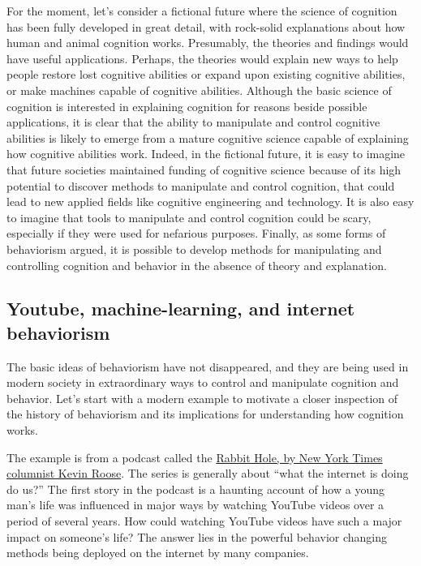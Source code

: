 \documentclass[
  oneside,
  12pt]{crumpbook}
\begin{document}
For the moment, let's consider a fictional future where the science of cognition has been fully developed in great detail, with rock-solid explanations about how human and animal cognition works. Presumably, the theories and findings would have useful applications. Perhaps, the theories would explain new ways to help people restore lost cognitive abilities or expand upon existing cognitive abilities, or make machines capable of cognitive abilities. Although the basic science of cognition is interested in explaining cognition for reasons beside possible applications, it is clear that the ability to manipulate and control cognitive abilities is likely to emerge from a mature cognitive science capable of explaining how cognitive abilities work. Indeed, in the fictional future, it is easy to imagine that future societies maintained funding of cognitive science because of its high potential to discover methods to manipulate and control cognition, that could lead to new applied fields like cognitive engineering and technology. It is also easy to imagine that tools to manipulate and control cognition could be scary, especially if they were used for nefarious purposes. Finally, as some forms of behaviorism argued, it is possible to develop methods for manipulating and controlling cognition and behavior in the absence of theory and explanation.

\hypertarget{youtube-machine-learning-and-internet-behaviorism}{%
\subsection{Youtube, machine-learning, and internet behaviorism}\label{youtube-machine-learning-and-internet-behaviorism}}

The basic ideas of behaviorism have not disappeared, and they are being used in modern society in extraordinary ways to control and manipulate cognition and behavior. Let's start with a modern example to motivate a closer inspection of the history of behaviorism and its implications for understanding how cognition works.

The example is from a podcast called the \href{https://www.nytimes.com/column/rabbit-hole}{Rabbit Hole, by New York Times columnist Kevin Roose}. The series is generally about ``what the internet is doing do us?'' The first story in the podcast is a haunting account of how a young man's life was influenced in major ways by watching YouTube videos over a period of several years. How could watching YouTube videos have such a major impact on someone's life? The answer lies in the powerful behavior changing methods being deployed on the internet by many companies.
\end{document}
